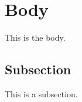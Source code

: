 \section{Body}\label{body}
This is the body.

\subsection{Subsection}\label{subsection}
This is a subsection.
